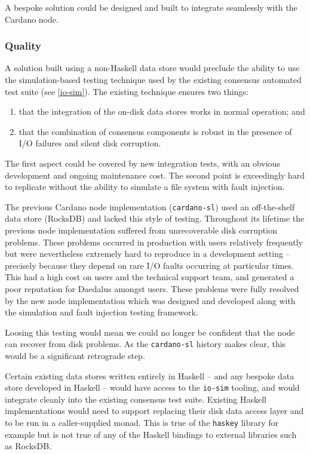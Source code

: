 \documentclass[11pt,a4paper]{article}
\begin{document}
A bespoke solution could be designed and built to integrate seamlessly with the
Cardano node.

\subsubsection{Quality}
\label{quality}

A solution built using a non-Haskell data store would preclude the ability to
use the simulation-based testing technique used by the existing consensus
automated test suite (see \cref{io-sim}). The existing technique ensures two
things:
\begin{enumerate}
\item that the integration of the on-disk data stores works in normal operation;
      and
\item that the combination of consensus components is robust in the presence of
      I/O failures and silent disk corruption.
\end{enumerate}
The first aspect could be covered by new integration tests, with an obvious
development and ongoing maintenance cost. The second point is exceedingly hard
to replicate without the ability to simulate a file system with fault injection.

The previous Cardano node implementation ({\tt cardano-sl}) used an
off-the-shelf data store (RocksDB) and lacked this style of testing. Throughout
its lifetime the previous node implementation suffered from unrecoverable disk
corruption problems. These problems occurred in production with users
relatively frequently but were nevertheless extremely hard to reproduce in a
development setting -- precisely because they depend on rare I/O faults
occurring at particular times. This had a high cost on users and the technical
support team, and generated a poor reputation for Daedalus amongst users. These
problems were fully resolved by the new node implementation which was designed
and developed along with the simulation and fault injection testing framework.

Loosing this testing would mean we could no longer be confident that the node
can recover from disk problems. As the {\tt cardano-sl} history makes clear,
this would be a significant retrograde step.

Certain existing data stores written entirely in Haskell -- and any bespoke
data store developed in Haskell -- would have access to the {\tt io-sim}
tooling, and would integrate cleanly into the existing consensus test suite.
Existing Haskell implementations would need to support replacing their disk
data access layer and to be run in a caller-supplied monad. This is true of the
{\tt haskey} library for example but is not true of any of the Haskell bindings
to external libraries such as RocksDB.
\end{document}
